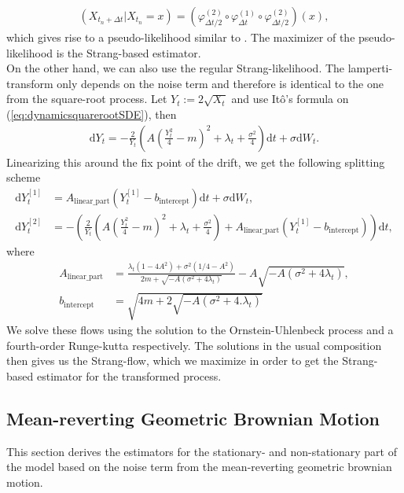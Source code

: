 \begin{align}
    \left(X_{t_n + \Delta t} | X_{t_n} = x\right) = \left(\varphi_{\Delta t/2}^{(2)} \circ \varphi_{\Delta t}^{(1)} \circ \varphi_{\Delta t/2}^{(2)}\right)(x),
\end{align} 
which gives rise to a pseudo-likelihood similar to \cite[(14)]{SplittingSchemes}. The maximizer of the pseudo-likelihood is the Strang-based estimator.\\
On the other hand, we can also use the regular Strang-likelihood. The lamperti-transform only depends on the noise term and therefore is identical to the one from the square-root process. Let $Y_t:= 2\sqrt{X_t}$ and use Itô's formula on (\ref{eq:dynamicsquarerootSDE}), then
\begin{align}
    \mathrm{d}Y_t = - \frac{2}{Y_t}\left(A\left(\frac{Y_t^2}{4} - m\right)^2 + \lambda_t + \frac{\sigma^2}{4}\right)\mathrm{d}t + \sigma \mathrm{d}W_t.
\end{align}
Linearizing this around the fix point of the drift, we get the following splitting scheme
\begin{align}
    \mathrm{d}Y_t^{[1]} &= A_{\mathrm{linear\_part}}\left(Y_t^{[1]} - b_{\mathrm{intercept}}\right)\mathrm{d}t + \sigma \mathrm{d}W_t,\\
    \mathrm{d}Y_t^{[2]} &= - \left(\frac{2}{Y_t}\left(A\left(\frac{Y_t^2}{4} - m\right)^2 + \lambda_t + \frac{\sigma^2}{4}\right) + A_{\mathrm{linear\_part}}\left(Y_t^{[1]} - b_{\mathrm{intercept}}\right)\right)\mathrm{d}t,
\end{align}
where 
\begin{align}
    A_{\mathrm{linear\_part}} &= \frac{\lambda_t \left(1 - 4A^2\right) + \sigma^2 \left(1/4 - A^2\right)}{2m + \sqrt{-A\left(\sigma^2 + 4 \lambda_t\right)}} - A \sqrt{-A\left(\sigma^2 + 4 \lambda_t\right)},  \\
    b_{\mathrm{intercept}} &= \sqrt{4m + 2 \sqrt{-A\left(\sigma^2 + 4 .\lambda_t\right)}}
\end{align}
We solve these flows using the solution to the Ornstein-Uhlenbeck process and a fourth-order Runge-kutta respectively. The solutions in the usual composition then gives us the Strang-flow, which we maximize in order to get the Strang-based estimator for the transformed process.
\subsection{Mean-reverting Geometric Brownian Motion}\label{subsec:meanrevertingGBM}
This section derives the estimators for the stationary- and non-stationary part of the model based on the noise term from the mean-reverting geometric brownian motion.
